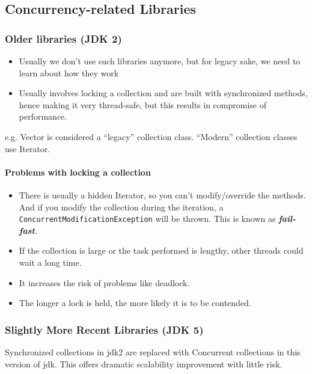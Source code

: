\documentclass[a4paper]{article}
\begin{document}
\subsection{Concurrency-related Libraries}
\subsubsection{Older libraries (JDK 2)}
\begin{itemize}
	\item Usually we don't use such libraries anymore, but for legacy sake, we need to learn about how they work
	\item Usually involves locking a collection and are built with synchronized methods, hence making it very thread-safe, but this results in compromise of performance.
\end{itemize}
\begin{displayquote}
	e.g. Vector is considered a “legacy” collection class. “Modern” collection classes use Iterator.
\end{displayquote}
\paragraph{Problems with locking a collection}
\begin{itemize}
	\item There is usually a hidden Iterator, so you can't modify/override the methods. And if you modify the collection during the iteration, a \texttt{ConcurrentModificationException} will be thrown. This is known as \textbf{\textit{fail-fast}}.
	\item If the collection is large or the task performed is lengthy, other threads could wait a long time.
	\item It increases the risk of problems like deadlock.
	\item The longer a lock is held, the more likely it is to be contended.
\end{itemize}
\subsubsection{Slightly More Recent Libraries (JDK 5)}
Synchronized collections in jdk2 are replaced with Concurrent collections in this version of jdk. This offers dramatic scalability improvement with little risk.
\end{document}
